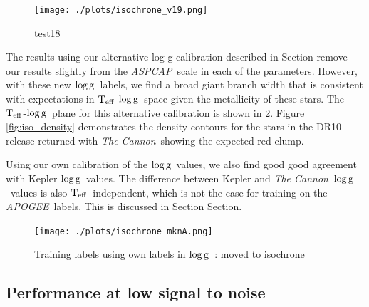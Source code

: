 \documentclass[12pt, preprint]{aastex}
\newcommand{\sectionname}{Section}
\newcommand{\teff}{\mbox{$\rm T_{eff}$}}
\newcommand{\logg}{\mbox{$\rm \log g$}}
\newcommand{\tc}{\textsl{The Cannon}}
\newcommand{\apogee}{\textsl{APOGEE}}
\newcommand{\aspcap}{\textsl{ASPCAP}}
\begin{document}
\begin{figure}[h!]
  \texttt{[image: ./plots/isochrone\_v19.png]}
\caption{test18}
\label{fig:test18}
\end{figure}

The results using our alternative log g calibration described in \sectionname{} remove our results slightly from the \aspcap\ scale in each of the parameters. However, with these new \logg\ labels, we find a broad giant branch width that is consistent with expectations in \teff-\logg\ space given the metallicity of these stars. The \teff-\logg\ plane for this alternative calibration is shown in \ref{fig:mknA}. Figure \ref{fig:iso_density} demonstrates the density contours for the stars in the DR10 release returned with \tc\, showing the expected red clump. 


Using our own calibration of the \logg\ values, we also find good  good agreement with Kepler \logg\ values. The difference between Kepler and \tc\ \logg\ values is also \teff\ independent, which is not the case for training on the \apogee\ labels. This is discussed in Section \sectionname{}.  


\begin{figure}[h!]
  \texttt{[image: ./plots/isochrone\_mknA.png]}
\caption{Training labels using own labels in \logg\ : moved to isochrone}
\label{fig:mknA}
\end{figure}



 \subsection{Performance at low signal to noise}
\end{document}
